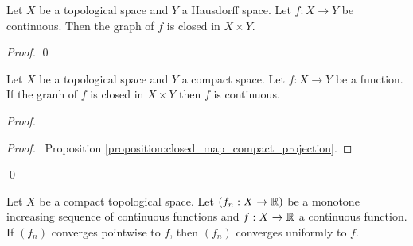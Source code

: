 \begin{proposition}
    \label{proposition:graph_closed}
    Let $X$ be a topological space and $Y$ a Hausdorff space.
    Let $f : X \rightarrow Y$ be continuous. Then the graph of $f$
    is closed in $X \times Y$.
\end{proposition}

\begin{proof}
    \qed
\end{proof}

\begin{theorem}
    Let $X$ be a topological space and $Y$ a compact space. Let $f : X \rightarrow Y$ be a function. 
    If the granh of $f$ is closed in $X \times Y$ then $f$ is continuous.
\end{theorem}

\begin{proof}
    \pf
        \begin{proof}
            \pf\ Proposition \ref{proposition:closed_map_compact_projection}.
        \end{proof}
    \qed
\end{proof}

\begin{theorem}
    Let $X$ be a compact topological space. Let $(f_n : X \rightarrow \mathbb{R})$ be a monotone increasing sequence of continuous functions and $f : X \rightarrow \mathbb{R}$
    a continuous function. If $(f_n)$ converges pointwise to $f$, then $(f_n)$ converges uniformly to $f$.
\end{theorem}


